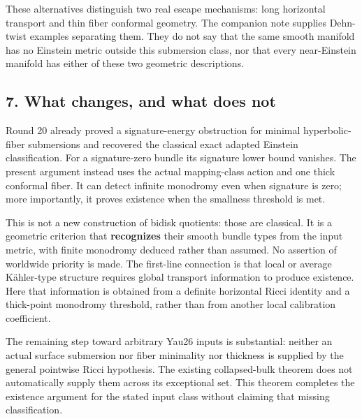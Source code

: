 \documentclass[
  11pt,
]{article}
\begin{document}
These alternatives distinguish two real escape mechanisms: long
horizontal transport and thin fiber conformal geometry. The companion
note supplies Dehn-twist examples separating them. They do not say that
the same smooth manifold has no Einstein metric outside this submersion
class, nor that every near-Einstein manifold has either of these two
geometric descriptions.

\hypertarget{what-changes-and-what-does-not}{%
\subsection{7. What changes, and what does
not}\label{what-changes-and-what-does-not}}

Round 20 already proved a signature-energy obstruction for minimal
hyperbolic-fiber submersions and recovered the classical exact adapted
Einstein classification. For a signature-zero bundle its signature lower
bound vanishes. The present argument instead uses the actual
mapping-class action and one thick conformal fiber. It can detect
infinite monodromy even when signature is zero; more importantly, it
proves existence when the smallness threshold is met.

This is not a new construction of bidisk quotients: those are classical.
It is a geometric criterion that \textbf{recognizes} their smooth bundle
types from the input metric, with finite monodromy deduced rather than
assumed. No assertion of worldwide priority is made. The first-line
connection is that local or average Kähler-type structure requires
global transport information to produce existence. Here that information
is obtained from a definite horizontal Ricci identity and a thick-point
monodromy threshold, rather than from another local calibration
coefficient.

The remaining step toward arbitrary Yau26 inputs is substantial: neither
an actual surface submersion nor fiber minimality nor thickness is
supplied by the general pointwise Ricci hypothesis. The existing
collapsed-bulk theorem does not automatically supply them across its
exceptional set. This theorem completes the existence argument for the
stated input class without claiming that missing classification.
\end{document}
